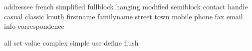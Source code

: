          {addressee}
            {french}
        {simplified}
         {fullblock}
           {hanging}
          {modified}
         {semiblock}
           {contact}
            {handle}
            {casual}
           {classic}
             {knuth}
         {firstname}
        {familyname}
            {street}
              {town}
            {mobile}
             {phone}
               {fax}
             {email}
              {info}
    {correspondence}
\stopinterface

\startinterface all
               {set}
             {value}
           {complex}
            {simple}
               {use}
            {define}
             {flush}
\stopinterface



\protect \endinput
